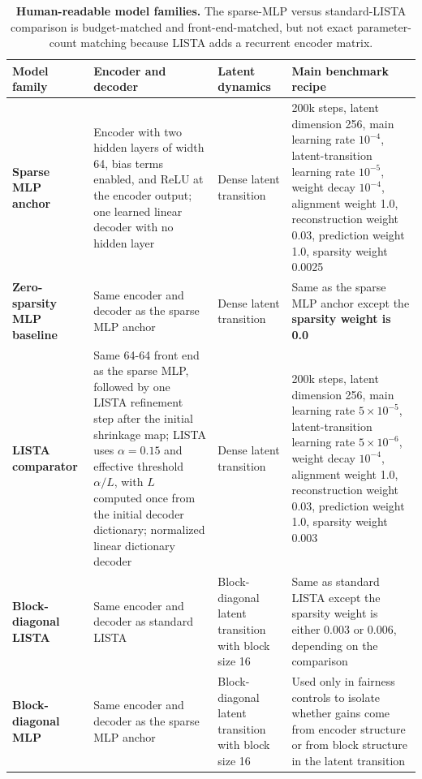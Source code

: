 \begin{table}[ht]
\centering
\scriptsize
\setlength{\tabcolsep}{4pt}
\begin{tabular}{p{}p{}p{}p{}}
\toprule
Model family & Encoder and decoder & Latent dynamics & Main benchmark recipe \\
\midrule
\textbf{Sparse MLP anchor} &
Encoder with two hidden layers of width 64, bias terms enabled, and ReLU at the encoder output; one learned linear decoder with no hidden layer &
Dense latent transition &
200k steps, latent dimension 256, main learning rate $10^{-4}$, latent-transition learning rate $10^{-5}$, weight decay $10^{-4}$, alignment weight 1.0, reconstruction weight 0.03, prediction weight 1.0, sparsity weight 0.0025 \\
\textbf{Zero-sparsity MLP baseline} &
Same encoder and decoder as the sparse MLP anchor &
Dense latent transition &
Same as the sparse MLP anchor except the \textbf{sparsity weight is 0.0} \\
\textbf{LISTA comparator} &
Same 64-64 front end as the sparse MLP, followed by one LISTA refinement step after the initial shrinkage map; LISTA uses $\alpha = 0.15$ and effective threshold $\alpha/L$, with $L$ computed once from the initial decoder dictionary; normalized linear dictionary decoder &
Dense latent transition &
200k steps, latent dimension 256, main learning rate $5 \times 10^{-5}$, latent-transition learning rate $5 \times 10^{-6}$, weight decay $10^{-4}$, alignment weight 1.0, reconstruction weight 0.03, prediction weight 1.0, sparsity weight 0.003 \\
\textbf{Block-diagonal LISTA} &
Same encoder and decoder as standard LISTA &
Block-diagonal latent transition with block size 16 &
Same as standard LISTA except the sparsity weight is either 0.003 or 0.006, depending on the comparison \\
\textbf{Block-diagonal MLP} &
Same encoder and decoder as the sparse MLP anchor &
Block-diagonal latent transition with block size 16 &
Used only in fairness controls to isolate whether gains come from encoder structure or from block structure in the latent transition \\
\bottomrule
\end{tabular}
\caption{\textbf{Human-readable model families.} The sparse-MLP versus standard-LISTA comparison is budget-matched and front-end-matched, but not exact parameter-count matching because LISTA adds a recurrent encoder matrix.}
\label{tab:review-model-families-20260314}
\end{table}


